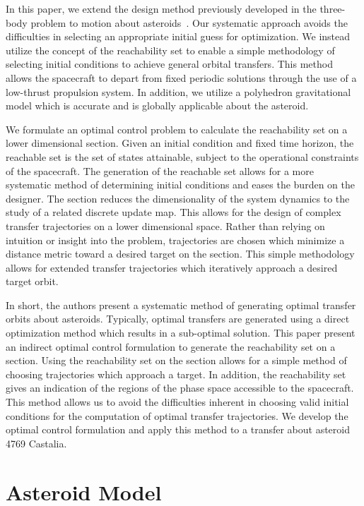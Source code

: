 \documentclass[]{aiaa-tc}%
\begin{document}
In this paper, we extend the design method previously developed in the three-body problem to motion about asteroids~\cite{kulumani2015}.
Our systematic approach avoids the difficulties in selecting an appropriate initial guess for optimization.
We instead utilize the concept of the reachability set to enable a simple methodology of selecting initial conditions to achieve general orbital transfers.
This method allows the spacecraft to depart from fixed periodic solutions through the use of a low-thrust propulsion system.
In addition, we utilize a polyhedron gravitational model which is accurate and is globally applicable about the asteroid.

We formulate an optimal control problem to calculate the reachability set on a lower dimensional \Poincare section.
Given an initial condition and fixed time horizon, the reachable set is the set of states attainable, subject to the operational constraints of the spacecraft.
The generation of the reachable set allows for a more systematic method of determining initial conditions and eases the burden on the designer.
The \Poincare section reduces the dimensionality of the system dynamics to the study of a related discrete update map.
This allows for the design of complex transfer trajectories on a lower dimensional space.
Rather than relying on intuition or insight into the problem, trajectories are chosen which minimize a distance metric toward a desired target on the \Poincare section.
This simple methodology allows for extended transfer trajectories which iteratively approach a desired target orbit.

In short, the authors present a systematic method of generating optimal transfer orbits about asteroids.
Typically, optimal transfers are generated using a direct optimization method which results in a sub-optimal solution.
This paper present an indirect optimal control formulation to generate the reachability set on a \Poincare section.
Using the reachability set on the \Poincare section allows for a simple method of choosing trajectories which approach a target.
In addition, the reachability set gives an indication of the regions of the phase space accessible to the spacecraft.
This method allows us to avoid the difficulties inherent in choosing valid initial conditions for the computation of optimal transfer trajectories.
We develop the optimal control formulation and apply this method to a transfer about asteroid 4769 Castalia.

\section{Asteroid Model}\label{sec:asteroid_model}
\end{document}

